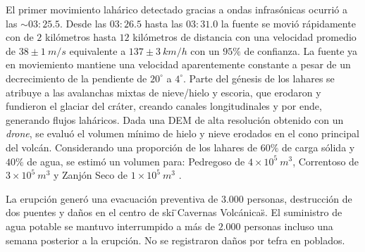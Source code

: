 El primer movimiento lahárico detectado gracias a ondas infrasónicas ocurrió a las $\sim03:25.5$. Desde las
$03:26.5$ hasta las $03:31.0$ la fuente se movió rápidamente con de $2$ kilómetros hasta $12$ kilómetros de distancia con una velocidad promedio de $38\pm 1\ m/s$ equivalente a $137\pm 3\ km/h$ con un $95\%$ de confianza. La fuente ya en moviemiento
mantiene una velocidad aparentemente constante a pesar de un decrecimiento de la pendiente de $20^\circ$ a $4^\circ$.
Parte del génesis de los lahares se atribuye a las avalanchas mixtas de nieve/hielo y escoria, que erodaron y fundieron el glaciar del cráter, creando canales longitudinales y por ende, generando flujos laháricos.
Dada una DEM de alta resolución obtenido con un \textit{drone}, se evaluó el volumen mínimo de hielo y nieve erodados en el cono principal del volcán. Considerando una proporción de los lahares de $60\%$ de carga sólida y
$40\%$ de agua, se estimó un volumen para: Pedregoso de $4\times 10^5\ m^3$, Correntoso de $3\times 10^5\ m^3$ y Zanjón Seco de $1\times 10^5\ m^3$ \cite{unknownvera}. 

La erupción generó una evacuación preventiva de $3.000$ personas, destrucción de dos puentes y daños en el centro de ski \"{}Cavernas Volcánicas\"{}. El suministro de agua potable se mantuvo interrumpido a más de $2.000$ personas incluso
una semana posterior a la erupción. No se registraron daños por tefra en poblados.

